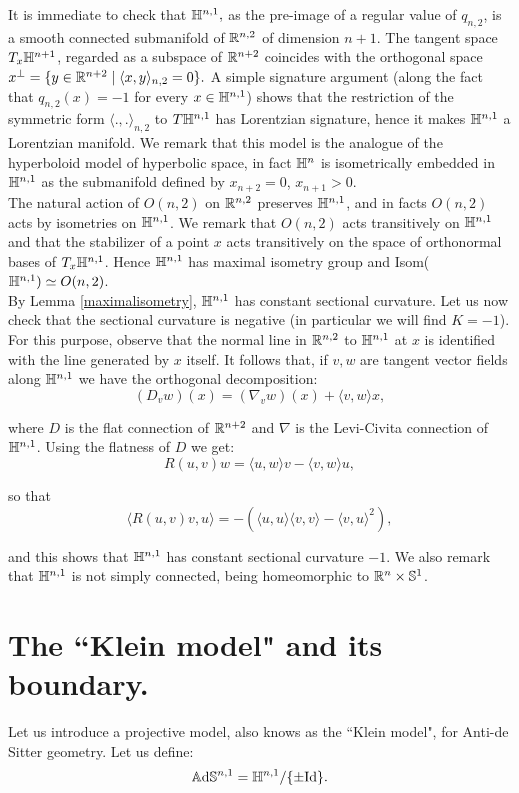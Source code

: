 It is immediate to check that $\mathbb{H}^{n,1},$ as the pre-image of a regular value of $q_{n,2}$, is a smooth connected submanifold of $\mathbb{R}^{n,2}$ of dimension $n+1$. The tangent space $T_x\mathbb{H}^{n+1}$, regarded as a subspace of $\mathbb{R}^{n+2}$ coincides with the orthogonal space $x^{\perp}=\{y\in \mathbb{R}^{n+2}\;|\;\langle x,y\rangle_{n,2}=0\}.$ A simple signature argument (along the fact that $q_{n,2}(x)=-1$ for every $x\in\mathbb{H}^{n,1}$) shows that the restriction of the symmetric form $\langle .,. \rangle_{n,2}$ to $T\mathbb{H}^{n,1}$ has Lorentzian signature, hence it makes $\mathbb{H}^{n,1}$ a Lorentzian manifold. We remark that this model is the analogue of the hyperboloid model of hyperbolic space, in fact $\mathbb{H}^n$ is isometrically embedded in $\mathbb{H}^{n,1}$ as the submanifold defined by $x_{n+2}=0$, $x_{n+1}>0$. \\
The natural action of $O(n,2)$ on $\mathbb{R}^{n,2}$ preserves $\mathbb{H}^{n,1}$, and in facts $O(n,2)$ acts by isometries on $\mathbb{H}^{n,1}$. We remark that $O(n,2)$ acts transitively on $\mathbb{H}^{n,1}$ and that the stabilizer of a point $x$ acts transitively on the space of orthonormal bases of $T_x\mathbb{H}^{n,1}$. Hence $\mathbb{H}^{n,1}$ has maximal isometry group and Isom($\mathbb{H}^{n,1})\simeq O(n,2)$.\\
By Lemma \ref{maximalisometry}, $\mathbb{H}^{n,1}$ has constant sectional curvature. Let us now check that the sectional curvature is negative (in particular we will find $K=-1$). For this purpose, observe that the normal line in $\mathbb{R}^{n,2}$ to $\mathbb{H}^{n,1}$ at $x$ is identified with the line generated by $x$ itself. It follows that, if $v,w$ are tangent vector fields along $\mathbb{H}^{n,1}$ we have the orthogonal decomposition: 
\[
    (D_{v}w)(x)=(\nabla_{v}w)(x)+\langle v,w\rangle x, 
\]

where $D$ is the flat connection of $\mathbb{R}^{n+2}$ and $\nabla$ is the Levi-Civita connection of $\mathbb{H}^{n,1}$. Using the flatness of $D$ we get: 
\[
    R(u,v)w=\langle u,w\rangle v-\langle v,w\rangle u,
\]

so that 
\[
    \langle R(u,v)v,u \rangle =-(\langle u,u\rangle\langle v,v\rangle-\langle v,u\rangle^2), 
\]

and this shows that $\mathbb{H}^{n,1}$ has constant sectional curvature $-1$. We also remark that $\mathbb{H}^{n,1}$ is not simply connected, being homeomorphic to $\mathbb{R}^{n}\times \mathbb{S}^1$. 

\section{The ``Klein model" and its boundary.}
Let us introduce a projective model, also knows as the ``Klein model", for Anti-de Sitter geometry. Let us define: 
\[
    \mathbb{A}\mathrm{d}\mathbb{S}^{n,1}=\mathbb{H}^{n,1}/\{\pm \text{Id}\}.
\]

